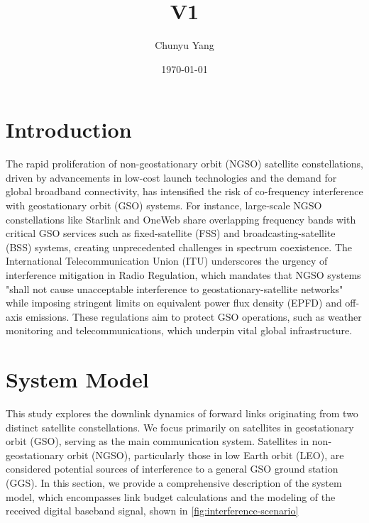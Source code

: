 \documentclass[12pt]{article}
\title{V1}
\author{Chunyu Yang}
\date{\today}
\begin{document}
\maketitle

\section{Introduction}

The rapid proliferation of non-geostationary orbit (NGSO) satellite constellations, driven by advancements in low-cost launch technologies and the demand for global broadband connectivity, has intensified the risk of co-frequency interference with geostationary orbit (GSO) systems. For instance, large-scale NGSO constellations like Starlink and OneWeb share overlapping frequency bands with critical GSO services such as fixed-satellite (FSS) and broadcasting-satellite (BSS) systems, creating unprecedented challenges in spectrum coexistence. The International Telecommunication Union (ITU) underscores the urgency of interference mitigation in Radio Regulation, which mandates that NGSO systems "shall not cause unacceptable interference to geostationary-satellite networks" while imposing stringent limits on equivalent power flux density (EPFD) and off-axis emissions. These regulations aim to protect GSO operations, such as weather monitoring and telecommunications, which underpin vital global infrastructure.



\section{System Model}

This study explores the downlink dynamics of forward links originating from two distinct satellite constellations. We focus primarily on satellites in geostationary orbit (GSO), serving as the main communication system. Satellites in non-geostationary orbit (NGSO), particularly those in low Earth orbit (LEO), are considered potential sources of interference to a general GSO ground station (GGS). In this section, we provide a comprehensive description of the system model, which encompasses link budget calculations and the modeling of the received digital baseband signal, shown in \autoref{fig:interference-scenario}
\end{document}
